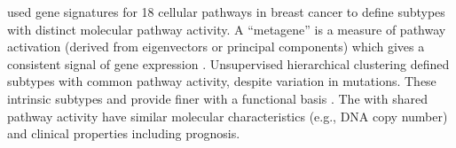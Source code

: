 \citet{Gatza2010} used gene signatures for 18 cellular \glspl{pathway} in breast cancer to define subtypes with distinct molecular \gls{pathway} activity. 
A ``\gls{metagene}'' is a measure of \gls{pathway} activation (derived from eigenvectors or principal components) which gives a consistent signal of \gls{gene expression} \citep{Huang2003, Anjomshoaa2008, Nagalla2013}. %
Unsupervised hierarchical clustering defined subtypes with common \gls{pathway} activity, despite variation in \glspl{mutation}. These \glspl{intrinsic subtype} and provide finer  with a functional basis \citep{Parker2009, Gatza2014}. The  with shared \gls{pathway} activity have similar molecular characteristics (e.g., \acrshort{DNA} copy number) and clinical properties including prognosis.


